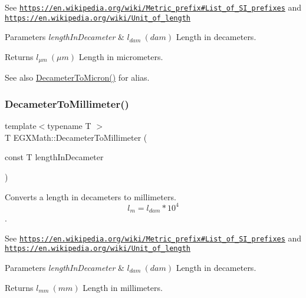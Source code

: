 See \href{https://en.wikipedia.org/wiki/Metric_prefix#List_of_SI_prefixes}{\tt https\+://en.\+wikipedia.\+org/wiki/\+Metric\+\_\+prefix\#\+List\+\_\+of\+\_\+\+S\+I\+\_\+prefixes} and \href{https://en.wikipedia.org/wiki/Unit_of_length}{\tt https\+://en.\+wikipedia.\+org/wiki/\+Unit\+\_\+of\+\_\+length} 
\begin{DoxyParams}{Parameters}
{\em length\+In\+Decameter} & $ l_{dam}\ (dam)$ Length in decameters. \\
\hline
\end{DoxyParams}
\begin{DoxyReturn}{Returns}
$ l_{\mu m}\ (\mu m)$ Length in micrometers. 
\end{DoxyReturn}
\begin{DoxySeeAlso}{See also}
\mbox{\hyperlink{group___e_g_x_math-_conversions-_length_conversions-_decameter-_non-_s_i_gaf3c7befd051b823dc17aca5318cae689}{Decameter\+To\+Micron()}} for alias. 
\end{DoxySeeAlso}
\mbox{\label{group___e_g_x_math-_conversions-_length_conversions-_decameter-_s_i_gaa1ebc69084f0d429e62a6af0ef509bb7}} 
\subsubsection{\texorpdfstring{Decameter\+To\+Millimeter()}{DecameterToMillimeter()}}
{\footnotesize\ttfamily template$<$typename T $>$ \\
T E\+G\+X\+Math\+::\+Decameter\+To\+Millimeter (\begin{DoxyParamCaption}\item[{const T}]{length\+In\+Decameter }\end{DoxyParamCaption})}



Converts a length in decameters to millimeters. \[ l_{m}=l_{dam} * 10^{4} \]. 

See \href{https://en.wikipedia.org/wiki/Metric_prefix#List_of_SI_prefixes}{\tt https\+://en.\+wikipedia.\+org/wiki/\+Metric\+\_\+prefix\#\+List\+\_\+of\+\_\+\+S\+I\+\_\+prefixes} and \href{https://en.wikipedia.org/wiki/Unit_of_length}{\tt https\+://en.\+wikipedia.\+org/wiki/\+Unit\+\_\+of\+\_\+length} 
\begin{DoxyParams}{Parameters}
{\em length\+In\+Decameter} & $ l_{dam}\ (dam)$ Length in decameters. \\
\hline
\end{DoxyParams}
\begin{DoxyReturn}{Returns}
$ l_{mm}\ (mm)$ Length in millimeters. 
\end{DoxyReturn}
\mbox{\label{group___e_g_x_math-_conversions-_length_conversions-_decameter-_s_i_gad2173f361037d8cfbdcc6b99c79a9105}} 
